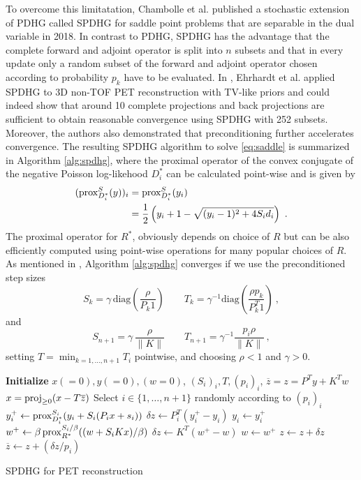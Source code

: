 To overcome this limitatation, Chambolle et al. published a stochastic extension of PDHG called SPDHG 
for saddle point problems that are separable in the dual variable \cite{Chambolle2018} in 2018.
In contrast to PDHG, SPDHG has the advantage that the complete forward and adjoint operator is 
split into $n$ subsets and that in every update only a random subset of the forward
and adjoint operator chosen according to probability $p_k$ have to be evaluated.
In \cite{Ehrhardt2019}, Ehrhardt et al. applied SPDHG to 3D non-TOF PET reconstruction with TV-like
priors and could indeed show that around 10 complete projections and back projections are sufficient 
to obtain reasonable convergence using SPDHG with 252 subsets.
Moreover, the authors also demonstrated that preconditioning further accelerates convergence.
The resulting SPDHG algorithm to solve \eqref{eq:saddle} is summarized in Algorithm \ref{alg:spdhg},
where the proximal operator of the convex conjugate of the negative Poisson log-likehood $D_i^*$ 
can be calculated point-wise and is given by
%
\begin{equation}
\begin{split}
(\operatorname{prox}_{D_i^*}^{S}(y))_i &= \operatorname{prox}_{D_i^*}^{S}(y_i) \\ 
&= \frac{1}{2} \left(y_i + 1 - \sqrt{ (y_i-1)^2 + 4 S_i d_i} \right) \ .
\end{split}
\label{eq:proxD}
\end{equation} 
%
The proximal operator for $R^*$, obviously depends on choice of $R$ but can be also efficiently 
computed using point-wise operations for many popular choices of $R$.
As mentioned in \cite{Ehrhardt2019}, Algorithm \ref{alg:spdhg} converges if we use the preconditioned
step sizes
%
\[ S_k = \gamma \, \text{diag}(\frac{\rho}{P_k 1} )\qquad  T_k = \gamma^{-1} \text{diag}(\frac{\rho p_k}{P^T_k 1}) \ , \]
% 
and
%
\[ S_{n+1} = \gamma \, \frac{\rho}{\|K\|} \qquad T_{n+1} = \gamma^{-1} \frac{p_i\rho}{\|K\|} \ , \]
%
setting $T = \min_{k=1,\ldots,n+1} T_i$ pointwise, and choosing $\rho<1$ and $\gamma>0$.
%
\begin{algorithm}[t]
\begin{algorithmic}[1]
\small
\State \textbf{Initialize} $x(=0),y(=0),(w=0)$, $(S_i)_i,T,(p_i)_i$,
\State $\overline{z} = z = P^T y + K^T w$
\Repeat
	\State $x = \operatorname{proj}_{\geq 0} (x - T \overline{z})$
	\State Select $i \in \{ 1,\ldots,n+1\} $ randomly according to $(p_i)_i$
	\State $y_i^+ \gets \operatorname{prox}_{D_i^*}^{S_i} ( y_i + S_i  ( P_i x + s_i))$
	\State $\delta z \gets P_i^T (y_i^+ - y_i)$
	\State $y_i \gets y_i^+$
  \Else
	\State $w^+ \gets \beta \operatorname{prox}_{R^*}^{S_i/\beta} ((w + S_i  K x)/\beta)$
	\State $\delta z \gets K^T (w^+ - w)$
	\State $w \gets w^+$
  \EndIf
	\State $z \gets z + \delta z$
	\State $\overline{z} \gets  z + (\delta z/p_i)$
\State {}
\end{algorithmic}
\caption{SPDHG for PET reconstruction \cite{Ehrhardt2019}}
\label{alg:spdhg}
\end{algorithm}
%

